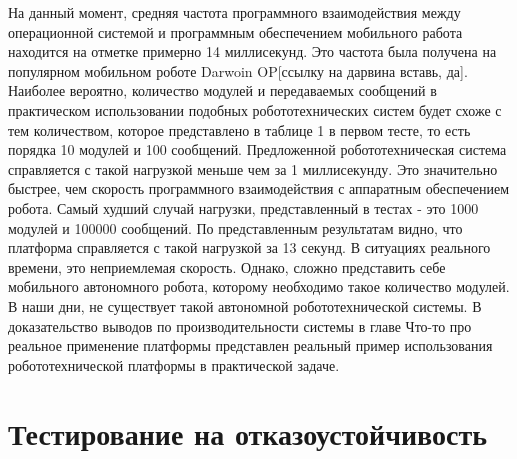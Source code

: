 На данный момент, средняя частота программного взаимодействия между операционной системой и программным обеспечением мобильного работа находится на отметке примерно 14 миллисекунд. Это частота была получена на популярном мобильном роботе Darwoin OP[ссылку на дарвина вставь, да]. Наиболее вероятно, количество модулей и передаваемых сообщений в практическом использовании подобных робототехнических систем будет схоже с тем количеством, которое представлено в таблице 1 в первом тесте, то есть порядка 10 модулей и 100 сообщений. Предложенной робототехническая система справляется с такой нагрузкой меньше чем за 1 миллисекунду. Это значительно быстрее, чем скорость программного взаимодействия с аппаратным обеспечением робота. Самый худший случай нагрузки, представленный в тестах - это 1000 модулей и 100000 сообщений. По представленным результатам видно, что платформа справляется с такой нагрузкой за 13 секунд. В ситуациях реального времени, это неприемлемая скорость. Однако, сложно представить себе мобильного автономного робота, которому необходимо такое количество модулей. В наши дни, не существует такой автономной робототехнической системы. В доказательство выводов по производительности системы в главе Что-то про реальное применение платформы представлен реальный пример использования робототехнической платформы в практической задаче.


\section{Тестирование на отказоустойчивость}